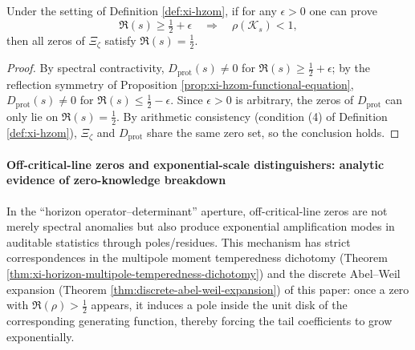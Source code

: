 \begin{theorem}[HZOM verifiable contraction template: spectral radius contraction \texorpdfstring{$\Rightarrow$}{=>} zeros forced to criticalize]\label{thm:xi-hzom-rh-reduction}
Under the setting of Definition \ref{def:xi-hzom}, if for any \(\epsilon>0\) one can prove
\[
\Re(s)\ge \tfrac12+\epsilon\quad\Longrightarrow\quad \rho(\mathcal{K}_s)<1,
\]
then all zeros of \(\Xi_{\zeta}\) satisfy \(\Re(s)=\tfrac12\).
\end{theorem}

\begin{proof}
By spectral contractivity, \(D_{\mathrm{prot}}(s)\neq 0\) for \(\Re(s)\ge \tfrac12+\epsilon\);
by the reflection symmetry of Proposition \ref{prop:xi-hzom-functional-equation}, \(D_{\mathrm{prot}}(s)\neq 0\) for \(\Re(s)\le \tfrac12-\epsilon\).
Since \(\epsilon>0\) is arbitrary, the zeros of \(D_{\mathrm{prot}}\) can only lie on \(\Re(s)=\tfrac12\).
By arithmetic consistency (condition (4) of Definition \ref{def:xi-hzom}), \(\Xi_{\zeta}\) and \(D_{\mathrm{prot}}\) share the same zero set, so the conclusion holds. \qedhere
\end{proof}

\paragraph{Off-critical-line zeros and exponential-scale distinguishers: analytic evidence of zero-knowledge breakdown}
In the ``horizon operator--determinant'' aperture, off-critical-line zeros are not merely spectral anomalies but also produce exponential amplification modes in auditable statistics through poles/residues.
This mechanism has strict correspondences in the multipole moment temperedness dichotomy (Theorem \ref{thm:xi-horizon-multipole-temperedness-dichotomy}) and the discrete Abel--Weil expansion (Theorem \ref{thm:discrete-abel-weil-expansion}) of this paper: once a zero with \(\Re(\rho)>\tfrac12\) appears, it induces a pole inside the unit disk of the corresponding generating function, thereby forcing the tail coefficients to grow exponentially.

